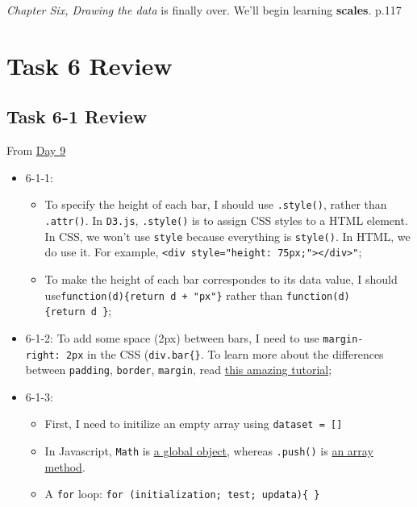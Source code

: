 \documentclass[
]{book}
\begin{document}
\emph{Chapter Six, Drawing the data} is finally over. We'll begin learning \textbf{scales}. p.117

\hypertarget{task-6-review}{%
\section{Task 6 Review}\label{task-6-review}}

\hypertarget{task-6-1-review}{%
\subsection{Task 6-1 Review}\label{task-6-1-review}}

From \href{https://observablehq.com/@hongtaoh/day-nine-spet-2-2020}{Day 9}

\begin{itemize}
\item
  6-1-1:

  \begin{itemize}
  \item
    To specify the height of each bar, I should use \texttt{.style()}, rather than \texttt{.attr()}. In \texttt{D3.js}, \texttt{.style()} is to assign CSS styles to a HTML element. In CSS, we won't use \texttt{style} because everything is \texttt{style()}. In HTML, we do use it. For example, \texttt{\textless{}div\ style="height:\ 75px;"\textgreater{}\textless{}/div\textgreater{}"};
  \item
    To make the height of each bar correspondes to its data value, I should use\texttt{function(d)\{return\ d\ +\ "px"\}} rather than \texttt{function(d)\{return\ d\ \}};
  \end{itemize}
\item
  6-1-2: To add some space (2px) between bars, I need to use \texttt{margin-right:\ 2px} in the CSS (\texttt{div.bar\{\}}. To learn more about the differences between \texttt{padding}, \texttt{border}, \texttt{margin}, read \href{https://developer.mozilla.org/en-US/docs/Web/CSS/CSS_Box_Model/Introduction_to_the_CSS_box_model}{this amazing tutorial};
\item
  6-1-3:

  \begin{itemize}
  \item
    First, I need to initilize an empty array using \texttt{dataset\ =\ {[}{]}}
  \item
    In Javascript, \texttt{Math} is \href{https://www.w3schools.com/js/js_math.asp}{a global object}, whereas \texttt{.push()} is \href{https://www.w3schools.com/js/js_array_methods.asp}{an array method}.
  \item
    A \texttt{for} loop: \texttt{for\ (initialization;\ test;\ updata)\{\ \}}
  \end{itemize}
\end{itemize}
\end{document}
